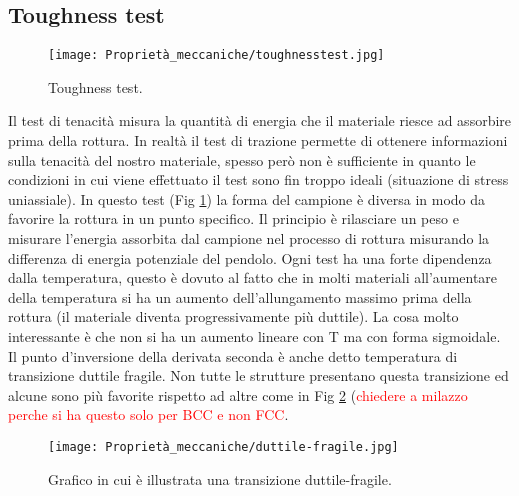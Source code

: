 \subsection{Toughness test}
\begin{figure}[h]
    \centering
    \texttt{[image: Proprietà\_meccaniche/toughnesstest.jpg]}
    \caption{Toughness test.}
    \label{oughnesstest}
\end{figure}

Il test di tenacità misura la quantità di energia che il materiale riesce ad assorbire prima della rottura. 
In realtà il test di trazione permette di ottenere informazioni sulla tenacità del nostro materiale, spesso però non è sufficiente in quanto le condizioni in cui viene effettuato il test sono fin troppo ideali (situazione di stress uniassiale). In questo test (Fig \ref{oughnesstest}) la forma del campione è diversa in modo da favorire la rottura in un punto specifico. Il principio è rilasciare un peso e misurare l'energia assorbita dal campione nel processo di rottura misurando la differenza di energia potenziale del pendolo.
Ogni test ha una forte dipendenza dalla temperatura, questo è dovuto al fatto che in molti materiali all'aumentare della temperatura si ha un aumento dell'allungamento massimo prima della rottura (il materiale diventa progressivamente più duttile). La cosa molto interessante è che non si ha un aumento lineare con T ma con forma sigmoidale. Il punto d'inversione della derivata seconda è anche detto temperatura di transizione duttile fragile.
Non tutte le strutture presentano questa transizione ed alcune sono più favorite rispetto ad altre come in Fig \ref{duttile-fragile} (\textcolor{red}{chiedere a milazzo perche si ha questo solo per BCC e non FCC}.
\begin{figure}[h]
    \centering
    \texttt{[image: Proprietà\_meccaniche/duttile-fragile.jpg]}
    \caption{Grafico in cui è illustrata una transizione duttile-fragile.}
    \label{duttile-fragile}
\end{figure}